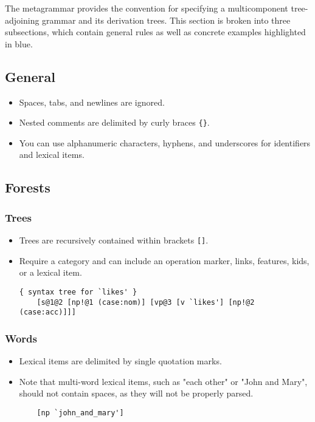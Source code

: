 \documentclass[10.5pt]{article}
\newcommand{\code}[1]{\texttt{#1}}
\begin{document}
The metagrammar provides the convention for specifying a multicomponent tree-adjoining grammar and its derivation trees. This section is broken into three subsections, which contain general rules as well as concrete examples highlighted in blue.

\subsection{General}
  \begin{itemize}
  \item Spaces, tabs, and newlines are ignored.
	\item Nested comments are delimited by curly braces \code{\{\}}.
	\item You can use alphanumeric characters, hyphens, and underscores for identifiers and lexical items. %
  \end{itemize}

\subsection{Forests}

\subsubsection{Trees}
  \begin{itemize}
	\item Trees are recursively contained within brackets \code{[]}.
    \item Require a category and can include an operation marker, links, features, kids, or a lexical item.

	\begin{mdframed}[backgroundcolor=blue!5]
	\begin{verbatim}
{ syntax tree for `likes' }
	[s@1@2 [np!@1 (case:nom)] [vp@3 [v `likes'] [np!@2 (case:acc)]]]
	\end{verbatim}
	\end{mdframed}
  \end{itemize}

\subsubsection{Words}
  \begin{itemize}
	\item Lexical items are delimited by single quotation marks.
	\item Note that multi-word lexical items, such as "each other" or "John and Mary",
	  should not contain spaces, as they will not be properly parsed.

	\begin{mdframed}[backgroundcolor=blue!5]
	\begin{verbatim}
	[np `john_and_mary']
	\end{verbatim}
	\end{mdframed}
  \end{itemize}
\end{document}
